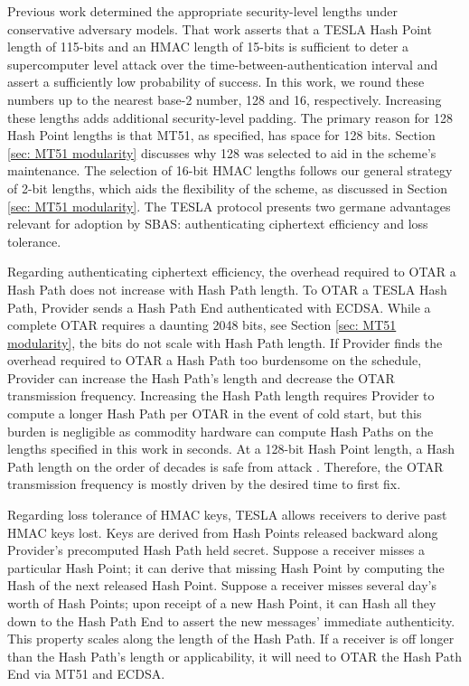 \documentclass[letterpaper,times]{IONconf/IONconf}
\begin{document}
Previous work determined the appropriate security-level lengths under conservative adversary models\cite{Neish_Dissertation}.
That work asserts that a TESLA Hash Point length of 115-bits and an HMAC length of 15-bits is sufficient to deter a supercomputer level attack over the time-between-authentication interval and assert a sufficiently low probability of success.
In this work, we round these numbers up to the nearest base-2 number, 128 and 16, respectively.
Increasing these lengths adds additional security-level padding.
The primary reason for 128 Hash Point lengths is that MT51, as specified, has space for 128 bits.
Section \ref{sec: MT51 modularity} discusses why 128 was selected to aid in the scheme's maintenance.
The selection of 16-bit HMAC lengths follows our general strategy of 2-bit lengths, which aids the flexibility of the scheme, as discussed in Section \ref{sec: MT51 modularity}.
The TESLA protocol presents two germane advantages relevant for adoption by SBAS: authenticating ciphertext efficiency and loss tolerance.

Regarding authenticating ciphertext efficiency, the overhead required to OTAR a Hash Path does not increase with Hash Path length.
To OTAR a TESLA Hash Path, Provider sends a Hash Path End authenticated with ECDSA.
While a complete OTAR requires a daunting 2048 bits, see Section \ref{sec: MT51 modularity}, the bits do not scale with Hash Path length.
If Provider finds the overhead required to OTAR a Hash Path too burdensome on the schedule, Provider can increase the Hash Path's length and decrease the OTAR transmission frequency.
Increasing the Hash Path length requires Provider to compute a longer Hash Path per OTAR in the event of cold start, but this burden is negligible as commodity hardware can compute Hash Paths on the lengths specified in this work in seconds.
At a 128-bit Hash Point length, a Hash Path length on the order of decades is safe from attack \cite{Neish_Dissertation}.
Therefore, the OTAR transmission frequency is mostly driven by the desired time to first fix.

Regarding loss tolerance of HMAC keys, TESLA allows receivers to derive past HMAC keys lost.
Keys are derived from Hash Points released backward along Provider's precomputed Hash Path held secret.
Suppose a receiver misses a particular Hash Point; it can derive that missing Hash Point by computing the Hash of the next released Hash Point.
Suppose a receiver misses several day's worth of Hash Points; upon receipt of a new Hash Point, it can Hash all they down to the Hash Path End to assert the new messages' immediate authenticity.
This property scales along the length of the Hash Path.
If a receiver is off longer than the Hash Path's length or applicability, it will need to OTAR the Hash Path End via MT51 and ECDSA.
\end{document}
